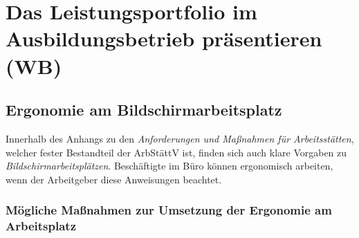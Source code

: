 \documentclass[a4paper, 12pt]{report}
\begin{document}
\section{Das Leistungsportfolio im Ausbildungsbetrieb präsentieren (WB)}

\subsection{Ergonomie am Bildschirmarbeitsplatz}

Innerhalb des Anhangs zu den \emph{Anforderungen und Maßnahmen für 
Arbeitsstätten}, welcher fester Bestandteil der ArbStättV ist, finden sich auch
klare Vorgaben zu \emph{Bildschirmarbeitsplätzen}. Beschäftigte im Büro können
ergonomisch arbeiten, wenn der Arbeitgeber diese Anweisungen beachtet.

\subsubsection{Mögliche Maßnahmen zur Umsetzung der Ergonomie am Arbeitsplatz}
\end{document}
